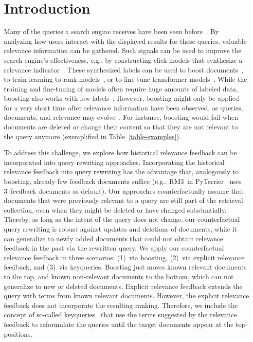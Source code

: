 \section{Introduction}

Many of the queries a search engine receives have been seen before~\cite{DBLP:journals/sigir/SilversteinHMM99}. By analyzing how users interact with the displayed results for these queries, valuable relevance information can be gathered. Such signals can be used to improve the search engine's effectiveness, e.g., by constructing click models that synthesize a relevance indicator~\cite{chuklin:2015}. These synthesized labels can be used to boost documents~\cite{keller:2024b}, to train learning-to-rank models~\cite{liu:2011}, or to fine-tune transformer models~\cite{lin:2021}. While the training and fine-tuning of models often require huge amounts of labeled data, boosting also works with few labels~\cite{keller:2024b}. However, boosting might only be applied for a very short time after relevance information have been observed, as queries, documents, and relevance may evolve~\cite{keller:2024}. For instance, boosting would fail when documents are deleted or change their content so that they are not relevant to the query anymore (exemplified in Table~\ref{table-examples}).




To address this challenge, we explore how historical relevance feedback can be incorporated into query rewriting approaches. Incorporating the historical relevance feedback into query rewriting has the advantage that, analogously to boosting, already few feedback documents suffice (e.g., RM3~in PyTerrier~\cite{macdonald:2020} uses 3~feedback documents as default). Our approaches counterfactually assume that documents that were previously relevant to a query are still part of the retrieval collection, even when they might be deleted or have changed substantially. Thereby, as long as the intent of the query does not change, our counterfactual query rewriting is robust against updates and deletions of documents, while it can generalize to newly added documents that could not obtain relevance feedback in the past via the rewritten query. We apply our counterfactual relevance feedback in three scenarios: (1)~via boosting, (2)~via explicit relevance feedback, and (3)~via keyqueries. Boosting just moves known relevant documents to the top, and known non-relevant documents to the bottom, which can not generalize to new or deleted documents. Explicit relevance feedback extends the query with terms from known relevant documents. However, the explicit relevance feedback does not incorporate the resulting ranking. Therefore, we include the concept of so-called keyqueries~\cite{gollub:2013a} that use the terms suggested by the relevance feedback to reformulate the queries until the target documents appear at the top-positions.

